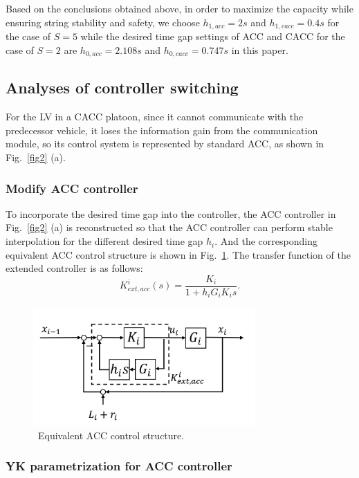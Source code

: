 \documentclass[journal]{IEEEtran}
\begin{document}
Based on the conclusions obtained above, in order to maximize the capacity while ensuring string stability and safety, we choose $h_{1,acc}=2s$ and $h_{1,cacc}=0.4s$ for the case of $S=5$ while the desired time gap settings of ACC and CACC for the case of $S=2$ are $h_{0,acc}=2.108s$ and $h_{0,cacc}=0.747s$ in this paper.

\subsection{Analyses of controller switching}
\label{Section 4.2}

For the LV in a CACC platoon, since it cannot communicate with the predecessor vehicle, it loses the information gain from the communication module, so its control system is represented by standard ACC, as shown in Fig.~\ref{fig2} (a).

\subsubsection{Modify ACC controller}
\label{Section 4.2.1}

To incorporate the desired time gap into the controller, the ACC controller in Fig.~\ref{fig2} (a) is reconstructed so that the ACC controller can perform stable interpolation for the different desired time gap $h_i$. And the corresponding equivalent ACC control structure is shown in Fig.~\ref{fig5}. The transfer function of the extended controller is as follows:
\begin{equation}
  K_{e x t, a c c}^{i}(s)=\frac{K_{i}}{1+h_{i} G_{i} K_{i} s}.
\end{equation}
\begin{figure}
  \centering
  \includegraphics[width=8.5cm]{figs/fig5.png}
  \caption{~Equivalent ACC control structure.}
  \label{fig5}
\end{figure}

\subsubsection{YK parametrization for ACC controller}
\label{Section 4.2.2}
\end{document}
